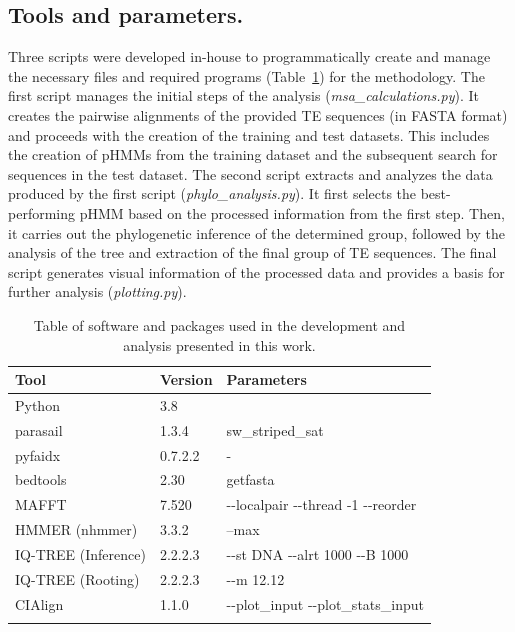 \documentclass[unnumsec,webpdf,contemporary,large]{oup-authoring-template}%
\theoremstyle{thmstyleone}%
\theoremstyle{thmstyletwo}%
\theoremstyle{thmstylethree}%
\begin{document}
\subsection{Tools and parameters.}\label{subsec2_6}

Three scripts were developed in-house to programmatically create and manage the
necessary files and required programs (Table~\ref{table:tab1}) for the
methodology. The first script manages the initial steps of the analysis
(\textit{msa\_calculations.py}). It creates the pairwise alignments of the
provided TE sequences (in FASTA format) and proceeds with the creation of the
training and test datasets. This includes the creation of pHMMs from the
training dataset and the subsequent search for sequences in the test dataset.
The second script extracts and analyzes the data produced by the first script
(\textit{phylo\_analysis.py}). It first selects the best-performing pHMM based
on the processed information from the first step. Then, it carries out the
phylogenetic inference of the determined group, followed by the analysis of the
tree and extraction of the final group of TE sequences. The final script
generates visual information of the processed data and provides a basis for
further analysis (\textit{plotting.py}).

\begin{table}[!h]
\caption{Table of software and packages used in the development and analysis
presented in this work.}\label{table:tab1} \tabcolsep=0pt%
\begin{tabularx}{\columnwidth}{@{\extracolsep{\fill}}lll@{\extracolsep{\fill}}}
\toprule
Tool & Version & Parameters \\
\midrule
Python & 3.8 &   \\
parasail & 1.3.4 & sw\_striped\_sat \\
pyfaidx~\cite{shirley_efficient_2015} & 0.7.2.2 & {-} \\
bedtools~\cite{quinlan_bedtools_2010} & 2.30 & getfasta \\
MAFFT & 7.520 & {-}{-}localpair {-}{-}thread {-}1 {-}{-}reorder \\
HMMER (nhmmer) & 3.3.2 & --max \\
IQ{-}TREE (Inference) & 2.2.2.3 & {-}{-}st DNA {-}{-}alrt 1000 {-}{-}B 1000 \\
IQ{-}TREE (Rooting) & 2.2.2.3 & {-}{-}m 12.12 \\
CIAlign~\cite{tumescheit_cialign_2022} & 1.1.0 &  {-}{-}plot\_input
{-}{-}plot\_stats\_input \\
\botrule{}
\end{tabularx}
\end{table}
\raggedbottom{}
\end{document}
